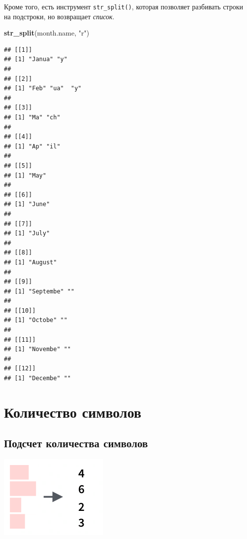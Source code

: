 \documentclass[
]{book}
\newenvironment{Shaded}{\begin{snugshade}}{\end{snugshade}}
\newcommand{\DataTypeTok}[1]{\textcolor[rgb]{0.13,0.29,0.53}{#1}}
\newcommand{\KeywordTok}[1]{\textcolor[rgb]{0.13,0.29,0.53}{\textbf{#1}}}
\newcommand{\NormalTok}[1]{#1}
\newcommand{\OperatorTok}[1]{\textcolor[rgb]{0.81,0.36,0.00}{\textbf{#1}}}
\newcommand{\StringTok}[1]{\textcolor[rgb]{0.31,0.60,0.02}{#1}}
\begin{document}
Кроме того, есть инструмент \texttt{str\_split()}, которая позволяет разбивать строки на подстроки, но возвращает \emph{список}.

\begin{Shaded}
\begin{Highlighting}[]
\KeywordTok{str_split}\NormalTok{(month.name, }\StringTok{"r"}\NormalTok{)}
\end{Highlighting}
\end{Shaded}

\begin{verbatim}
## [[1]]
## [1] "Janua" "y"    
## 
## [[2]]
## [1] "Feb" "ua"  "y"  
## 
## [[3]]
## [1] "Ma" "ch"
## 
## [[4]]
## [1] "Ap" "il"
## 
## [[5]]
## [1] "May"
## 
## [[6]]
## [1] "June"
## 
## [[7]]
## [1] "July"
## 
## [[8]]
## [1] "August"
## 
## [[9]]
## [1] "Septembe" ""        
## 
## [[10]]
## [1] "Octobe" ""      
## 
## [[11]]
## [1] "Novembe" ""       
## 
## [[12]]
## [1] "Decembe" ""
\end{verbatim}

\hypertarget{ux43aux43eux43bux438ux447ux435ux441ux442ux432ux43e-ux441ux438ux43cux432ux43eux43bux43eux432}{%
\section{Количество символов}\label{ux43aux43eux43bux438ux447ux435ux441ux442ux432ux43e-ux441ux438ux43cux432ux43eux43bux43eux432}}

\hypertarget{ux43fux43eux434ux441ux447ux435ux442-ux43aux43eux43bux438ux447ux435ux441ux442ux432ux430-ux441ux438ux43cux432ux43eux43bux43eux432}{%
\subsection{Подсчет количества символов}\label{ux43fux43eux434ux441ux447ux435ux442-ux43aux43eux43bux438ux447ux435ux441ux442ux432ux430-ux441ux438ux43cux432ux43eux43bux43eux432}}

\includegraphics{images/5.01_str_length.png}

\begin{Shaded}
\end{Shaded}
\end{document}
